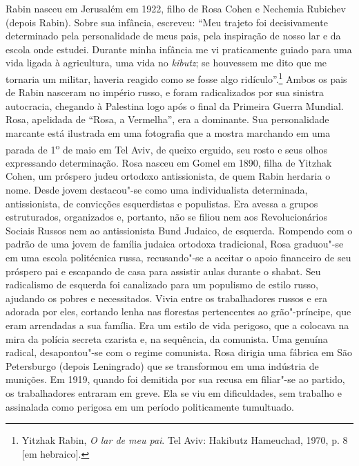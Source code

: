 Rabin nasceu em Jerusalém em 1922, filho de Rosa Cohen e Nechemia
Rubichev (depois Rabin). Sobre sua infância, escreveu: ``Meu trajeto foi
decisivamente determinado pela personalidade de meus pais, pela
inspiração de nosso lar e da escola onde estudei. Durante minha infância
me vi praticamente guiado para uma vida ligada à agricultura, uma vida
no \emph{kibutz}; se houvessem me dito que me tornaria um militar, haveria
reagido como se fosse algo ridículo''.\footnote{Yitzhak Rabin, 
\emph{O lar de meu pai}. Tel Aviv: Hakibutz Hameuchad, 1970, p. 8 {[}em hebraico{]}.} Ambos
os pais de Rabin nasceram no império russo, e foram radicalizados por
sua sinistra autocracia, chegando à Palestina logo após o final da
Primeira Guerra Mundial. Rosa, apelidada de ``Rosa, a Vermelha'', era a
dominante. Sua personalidade marcante está ilustrada em uma fotografia
que a mostra marchando em uma parada de 1\textsuperscript{o} de maio em
Tel Aviv, de queixo erguido, seu rosto e seus olhos expressando
determinação. Rosa nasceu em Gomel em 1890, filha de Yitzhak Cohen, um
próspero judeu ortodoxo antissionista, de quem Rabin herdaria o nome.
Desde jovem destacou"-se como uma individualista determinada,
antissionista, de convicções esquerdistas e populistas. Era avessa a
grupos estruturados, organizados e, portanto, não se filiou nem aos
Revolucionários Sociais Russos nem ao antissionista Bund Judaico, de
esquerda. Rompendo com o padrão de uma jovem de família judaica ortodoxa
tradicional, Rosa graduou"-se em uma escola politécnica russa,
recusando"-se a aceitar o apoio financeiro de seu próspero pai e
escapando de casa para assistir aulas durante o shabat. Seu radicalismo
de esquerda foi canalizado para um populismo de estilo russo, ajudando
os pobres e necessitados. Vivia entre os trabalhadores russos e era
adorada por eles, cortando lenha nas florestas pertencentes ao
grão"-príncipe, que eram arrendadas a sua família. Era um estilo de vida
perigoso, que a colocava na mira da polícia secreta czarista e, na
sequência, da comunista. Uma genuína radical, desapontou"-se com o regime
comunista. Rosa dirigia uma fábrica em São Petersburgo (depois
Leningrado) que se transformou em uma indústria de munições. Em 1919,
quando foi demitida por sua recusa em filiar"-se ao partido, os
trabalhadores entraram em greve. Ela se viu em dificuldades, sem
trabalho e assinalada como perigosa em um período politicamente
tumultuado.

